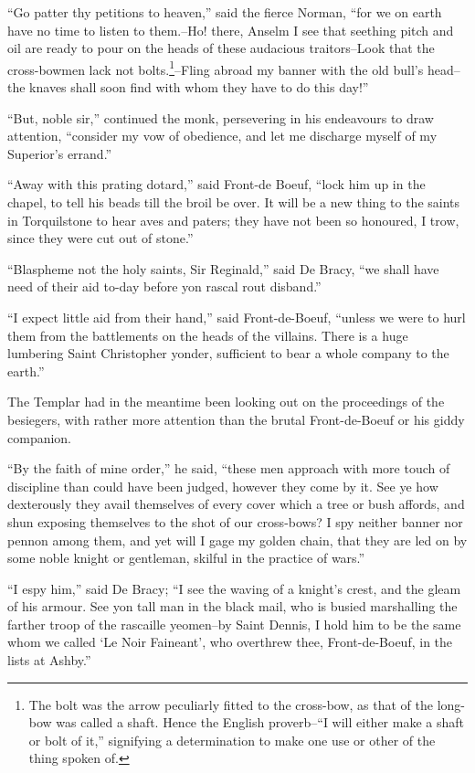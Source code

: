 ``Go patter thy petitions to heaven,'' said the fierce Norman, ``for we
on earth have no time to listen to them.--Ho! there, Anselm I see that
seething pitch and oil are ready to pour on the heads of these audacious
traitors--Look that the cross-bowmen lack not bolts.\footnote{The bolt was
the arrow peculiarly fitted to the
cross-bow, as that of the long-bow was called a shaft. Hence the English
proverb--``I will either make a shaft or bolt of it,'' signifying a
determination to make one use or other of the thing spoken of.}--Fling
abroad my banner with the old bull's head--the knaves shall soon find
with whom they have to do this day!''

``But, noble sir,'' continued the monk, persevering in his endeavours to
draw attention, ``consider my vow of obedience, and let me discharge
myself of my Superior's errand.''

``Away with this prating dotard,'' said Front-de Boeuf, ``lock him up in
the chapel, to tell his beads till the broil be over. It will be a new
thing to the saints in Torquilstone to hear aves and paters; they have
not been so honoured, I trow, since they were cut out of stone.''

``Blaspheme not the holy saints, Sir Reginald,'' said De Bracy, ``we
shall have need of their aid to-day before yon rascal rout disband.''

``I expect little aid from their hand,'' said Front-de-Boeuf, ``unless
we were to hurl them from the battlements on the heads of the villains.
There is a huge lumbering Saint Christopher yonder, sufficient to bear a
whole company to the earth.''

The Templar had in the meantime been looking out on the proceedings of
the besiegers, with rather more attention than the brutal Front-de-Boeuf
or his giddy companion.

``By the faith of mine order,'' he said, ``these men approach with more
touch of discipline than could have been judged, however they come by
it. See ye how dexterously they avail themselves of every cover which a
tree or bush affords, and shun exposing themselves to the shot of our
cross-bows? I spy neither banner nor pennon among them, and yet will I
gage my golden chain, that they are led on by some noble knight or
gentleman, skilful in the practice of wars.''

``I espy him,'' said De Bracy; ``I see the waving of a knight's crest,
and the gleam of his armour. See yon tall man in the black mail, who is
busied marshalling the farther troop of the rascaille yeomen--by Saint
Dennis, I hold him to be the same whom we called `Le Noir Faineant', who
overthrew thee, Front-de-Boeuf, in the lists at Ashby.''

